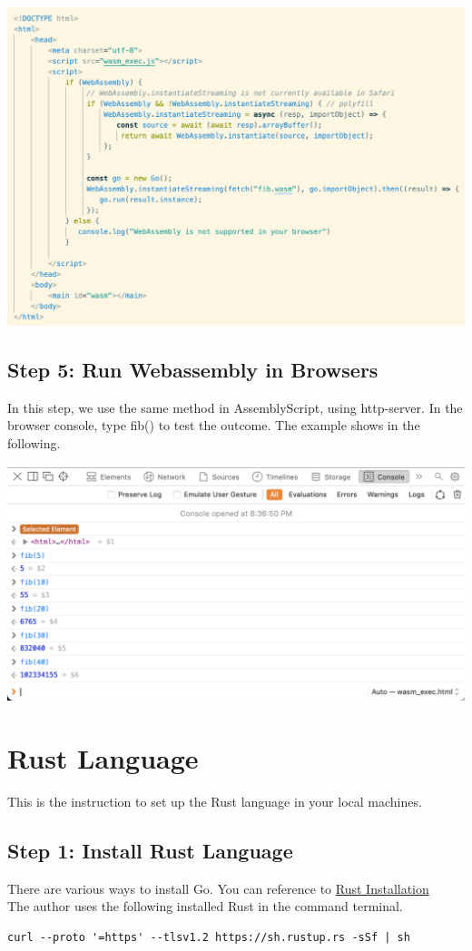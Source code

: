 \documentclass[12pt]{article}
\begin{document}
\includegraphics[scale = 0.6]{img/go-html}

\subsection{Step 5: Run Webassembly in Browsers}
In this step, we use the same method in AssemblyScript, using http-server. In the browser console, type fib() to test 
the outcome. The example shows in the following.
~\newline

\includegraphics[scale = 0.6]{img/go-browser}

\pagebreak
\section{Rust Language}
This is the instruction to set up the Rust language in your local machines.

\subsection{Step 1: Install Rust Language}
There are various ways to install Go. You can reference to \href{https://doc.rust-lang.org/book/ch01-01-installation.html}{Rust Installation}
~\newline
The author uses the following installed Rust in the command terminal.
~\newline
\begin{verbatim}
curl --proto '=https' --tlsv1.2 https://sh.rustup.rs -sSf | sh
\end{verbatim}
\end{document}

